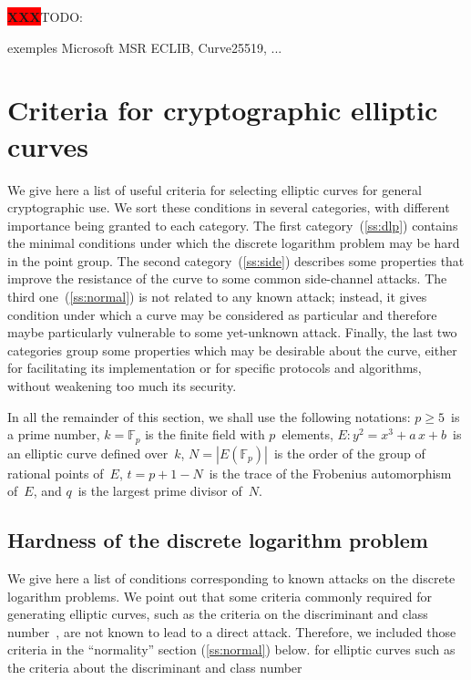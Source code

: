 \documentclass{article}
\def\F{\mathbb{F}}
\def\abs#1{\left|#1\right|}
\def\XXX{{\colorbox{red}{{\color{white}\bfseries XXX}}}}
\begin{document}
\sloppy

\XXX TODO:

exemples Microsoft MSR ECLIB, Curve25519, ...

\section{Criteria for cryptographic elliptic curves}
\label{s:criteria}

We give here a list of useful criteria for selecting elliptic curves
for general cryptographic use.
We sort these conditions in several categories,
with different importance being granted to each category.
The first category~(\ref{ss:dlp}) contains the minimal conditions under which
the discrete logarithm problem may be hard in the point group.
The second category~(\ref{ss:side}) describes some properties that improve
the resistance of the curve to some common side-channel attacks.
The third one~(\ref{ss:normal}) is not related to any known attack;
instead, it gives condition under which a curve may be considered
as particular and therefore maybe particularly vulnerable
to some yet-unknown attack.
Finally, the last two categories group some properties
which may be desirable about the curve,
either for facilitating its implementation
or for specific protocols and algorithms,
without weakening too much its security.

In all the remainder of this section,
we shall use the following notations:
$p ≥ 5$~is a prime number,
$k = \F_{p}$ is the finite field with $p$~elements,
$E: y^2 = x^3 + a\,x + b$~is an elliptic curve defined over~$k$,
$N = \abs{E(\F_p)}$~is the order of the group of rational points of~$E$,
$t = p + 1 - N$~is the trace of the Frobenius automorphism of~$E$,
and $q$~is the largest prime divisor of~$N$.


\subsection{Hardness of the discrete logarithm problem}

We give here a list of conditions corresponding to
known attacks on the discrete logarithm problems.
We point out that some criteria commonly required
for generating elliptic curves,
such as the criteria on the discriminant and class number~\cite{rfc5639},
are not known to lead to a direct attack.
Therefore, we included those criteria
in the “normality” section (\ref{ss:normal}) below.
for elliptic curves
such as the criteria about the discriminant and class number
\end{document}
